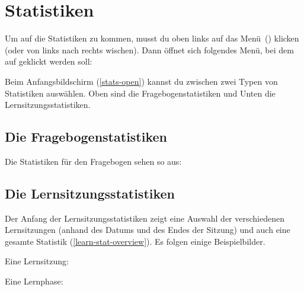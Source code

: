 \documentclass[ngerman]{tutorial}
\begin{document}
\clearpage
\section{Statistiken}
Um auf die Statistiken zu kommen, musst du oben links auf das Menü~(\faNavicon) klicken (oder von links nach rechts wischen). Dann öffnet sich folgendes Menü, bei dem auf  geklickt werden soll:
\begin{center}
    \quad{}\quad{}
\end{center}

Beim Anfangsbildschirm (\autoref{stats-open}) kannst du zwischen zwei Typen von Statistiken auswählen. Oben sind die Fragebogenstatistiken und Unten die Lernsitzungsstatistiken.

\subsection{Die Fragebogenstatistiken}
Die Statistiken für den Fragebogen sehen so aus:
\begin{center}
\end{center}

\subsection{Die Lernsitzungsstatistiken}
Der Anfang der Lernsitzungsstatistiken zeigt eine Auswahl der verschiedenen Lernsitzungen (anhand des Datums und des Endes der Sitzung) und auch eine gesamte Statistik (\autoref{learn-stat-overview}).
Es folgen einige Beispielbilder.\vfill

\begin{center}
    Eine Lernsitzung:\medskip\\
    \qquad
\end{center}\vfill

\begin{center}
    Eine Lernphase:\medskip\\
    \qquad
\end{center}\vfill
\end{document}
